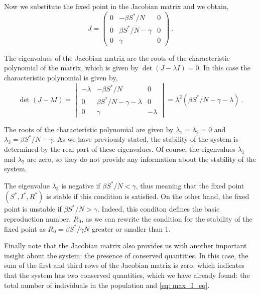 Now we substitute the fixed point in the Jacobian matrix and we obtain,
\begin{equation}
  J=\begin{pmatrix}
    0 & -\beta S^*/N       & 0 \\
    0 & \beta S^*/N-\gamma & 0 \\
    0 & \gamma             & 0
  \end{pmatrix} \ .
\end{equation}

The eigenvalues of the Jacobian matrix are the roots of the characteristic
polynomial of the matrix, which is given by $\det(J-\lambda I)=0$. In this case
the characteristic polynomial is given by,
\begin{equation}
  \det(J-\lambda I)=\begin{vmatrix}
    -\lambda & -\beta S^*/N                & 0        \\
    0        & \beta S^*/N-\gamma -\lambda & 0        \\
    0        & \gamma                      & -\lambda
  \end{vmatrix}=\lambda^2(\beta S^*/N-\gamma-\lambda) \ .
\end{equation}

The roots of the characteristic polynomial are given by $\lambda_1=\lambda_2=0$
and $\lambda_3=\beta S^*/N-\gamma$. As we have previously stated, the stability
of the system is determined by the real part of these eigenvalues. Of course,
the eigenvalues $\lambda_1$ and $\lambda_2$ are zero, so they do not provide
any information about the stability of the system.

The eigenvalue $\lambda_3$ is negative if $\beta S^*/N<\gamma$, thus meaning
that the fixed point $(S^*,I^*,R^*)$ is stable if this condition is satisfied.
On the other hand, the fixed point is unstable if $\beta S^*/N>\gamma$. Indeed,
this conditon defines the basic reproduction number, $R_0$, as we can rewrite
the condition for the stability of the fixed point as $R_0=\beta S^*/\gamma N$
greater or smaller than 1.

Finally note that the Jacobian matrix also provides us with another important
insight about the system: the presence of conserved quantities. In this case,
the sum of the first and third rows of the Jacobian matrix is zero, which
indicates that the system has two conserved quantities, which we have already
found: the total number of individuals in the population and \cref{eq:
  max_I_eq}.

